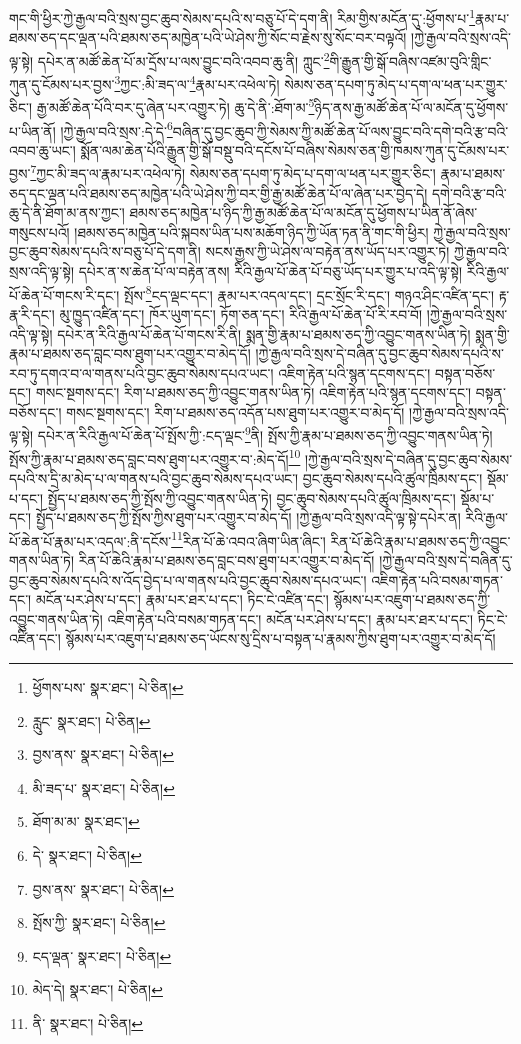 གང་གི་ཕྱིར་ཀྱེ་རྒྱལ་བའི་སྲས་བྱང་ཆུབ་སེམས་དཔའི་ས་བཅུ་པོ་དེ་དག་ནི། རིམ་གྱིས་མངོན་དུ་:ཕྱོགས་པ་\footnote{ཕྱོགས་པས་  སྣར་ཐང་།  པེ་ཅིན། }རྣམ་པ་ཐམས་ཅད་དང་ལྡན་པའི་ཐམས་ཅད་མཁྱེན་པའི་ཡེ་ཤེས་ཀྱི་སོང་བ་རྗེས་སུ་སོང་བར་བལྟའོ། །ཀྱེ་རྒྱལ་བའི་སྲས་འདི་ལྟ་སྟེ། དཔེར་ན་མཚོ་ཆེན་པོ་མ་དྲོས་པ་ལས་བྱུང་བའི་འབབ་ཆུ་ནི། ཀླུང་\footnote{རླུང་  སྣར་ཐང་།  པེ་ཅིན། }གི་རྒྱུན་གྱི་སྒོ་བཞིས་འཛམ་བུའི་གླིང་ཀུན་དུ་ངོམས་པར་བྱས་\footnote{བྱས་ནས་  སྣར་ཐང་།  པེ་ཅིན། }ཀྱང་:མི་ཟད་ལ་\footnote{མི་ཟད་པ་  སྣར་ཐང་།  པེ་ཅིན། }རྣམ་པར་འཕེལ་ཏེ། སེམས་ཅན་དཔག་ཏུ་མེད་པ་དག་ལ་ཕན་པར་གྱུར་ཅིང་། རྒྱ་མཚོ་ཆེན་པོའི་བར་དུ་ཞེན་པར་འགྱུར་ཏེ། ཆུ་དེ་ནི་:ཐོག་མ་\footnote{ཐོག་མ་མ་  སྣར་ཐང་། }ཉིད་ནས་རྒྱ་མཚོ་ཆེན་པོ་ལ་མངོན་དུ་ཕྱོགས་པ་ཡིན་ནོ། །ཀྱེ་རྒྱལ་བའི་སྲས་:དེ་དེ་\footnote{དེ་  སྣར་ཐང་།  པེ་ཅིན། }བཞིན་དུ་བྱང་ཆུབ་ཀྱི་སེམས་ཀྱི་མཚོ་ཆེན་པོ་ལས་བྱུང་བའི་དགེ་བའི་རྩ་བའི་འབབ་ཆུ་ཡང་། སྨོན་ལམ་ཆེན་པོའི་རྒྱུན་གྱི་སྒོ་བསྡུ་བའི་དངོས་པོ་བཞིས་སེམས་ཅན་གྱི་ཁམས་ཀུན་དུ་ངོམས་པར་བྱས་\footnote{བྱས་ནས་  སྣར་ཐང་།  པེ་ཅིན། }ཀྱང་མི་ཟད་ལ་རྣམ་པར་འཕེལ་ཏེ། སེམས་ཅན་དཔག་ཏུ་མེད་པ་དག་ལ་ཕན་པར་གྱུར་ཅིང་། རྣམ་པ་ཐམས་ཅད་དང་ལྡན་པའི་ཐམས་ཅད་མཁྱེན་པའི་ཡེ་ཤེས་ཀྱི་བར་གྱི་རྒྱ་མཚོ་ཆེན་པོ་ལ་ཞེན་པར་བྱེད་དེ། དགེ་བའི་རྩ་བའི་ཆུ་དེ་ནི་ཐོག་མ་ནས་ཀྱང་། ཐམས་ཅད་མཁྱེན་པ་ཉིད་ཀྱི་རྒྱ་མཚོ་ཆེན་པོ་ལ་མངོན་དུ་ཕྱོགས་པ་ཡིན་ནོ་ཞེས་གསུངས་པའོ། །ཐམས་ཅད་མཁྱེན་པའི་སྐབས་ཡིན་པས་མཆོག་ཉིད་ཀྱི་ཡོན་ཏན་ནི་གང་གི་ཕྱིར། ཀྱེ་རྒྱལ་བའི་སྲས་བྱང་ཆུབ་སེམས་དཔའི་ས་བཅུ་པོ་དེ་དག་ནི། སངས་རྒྱས་ཀྱི་ཡེ་ཤེས་ལ་བརྟེན་ནས་ཡོད་པར་འགྱུར་ཏེ། ཀྱེ་རྒྱལ་བའི་སྲས་འདི་ལྟ་སྟེ། དཔེར་ན་ས་ཆེན་པོ་ལ་བརྟེན་ནས། རིའི་རྒྱལ་པོ་ཆེན་པོ་བཅུ་ཡོད་པར་གྱུར་པ་འདི་ལྟ་སྟེ། རིའི་རྒྱལ་པོ་ཆེན་པོ་གངས་རི་དང་། སྤོས་\footnote{སྤོས་ཀྱི་  སྣར་ཐང་།  པེ་ཅིན། }ངད་ལྡང་དང་། རྣམ་པར་འདལ་དང་། དྲང་སྲོང་རི་དང་། གཉའ་ཤིང་འཛིན་དང་། རྟ་རྣ་རི་དང་། མུ་ཁྱུད་འཛིན་དང་། ཁོར་ཡུག་དང་། ཏོག་ཅན་དང་། རིའི་རྒྱལ་པོ་ཆེན་པོ་རི་རབ་བོ། །ཀྱེ་རྒྱལ་བའི་སྲས་འདི་ལྟ་སྟེ། དཔེར་ན་རིའི་རྒྱལ་པོ་ཆེན་པོ་གངས་རི་ནི། སྨན་གྱི་རྣམ་པ་ཐམས་ཅད་ཀྱི་འབྱུང་གནས་ཡིན་ཏེ། སྨན་གྱི་རྣམ་པ་ཐམས་ཅད་བླང་བས་ཐུག་པར་འགྱུར་བ་མེད་དོ། །ཀྱེ་རྒྱལ་བའི་སྲས་དེ་བཞིན་དུ་བྱང་ཆུབ་སེམས་དཔའི་ས་རབ་ཏུ་དགའ་བ་ལ་གནས་པའི་བྱང་ཆུབ་སེམས་དཔའ་ཡང་། འཇིག་རྟེན་པའི་སྙན་དངགས་དང་། བསྟན་བཅོས་དང་། གསང་སྔགས་དང་། རིག་པ་ཐམས་ཅད་ཀྱི་འབྱུང་གནས་ཡིན་ཏེ། འཇིག་རྟེན་པའི་སྙན་དངགས་དང་། བསྟན་བཅོས་དང་། གསང་སྔགས་དང་། རིག་པ་ཐམས་ཅད་འདོན་པས་ཐུག་པར་འགྱུར་བ་མེད་དོ། །ཀྱེ་རྒྱལ་བའི་སྲས་འདི་ལྟ་སྟེ། དཔེར་ན་རིའི་རྒྱལ་པོ་ཆེན་པོ་སྤོས་ཀྱི་:ངད་ལྡང་\footnote{ངད་ལྡན་  སྣར་ཐང་།  པེ་ཅིན། }ནི། སྤོས་ཀྱི་རྣམ་པ་ཐམས་ཅད་ཀྱི་འབྱུང་གནས་ཡིན་ཏེ། སྤོས་ཀྱི་རྣམ་པ་ཐམས་ཅད་བླང་བས་ཐུག་པར་འགྱུར་བ་:མེད་དོ།\footnote{མེད་དེ།  སྣར་ཐང་།  པེ་ཅིན། } །ཀྱེ་རྒྱལ་བའི་སྲས་དེ་བཞིན་དུ་བྱང་ཆུབ་སེམས་དཔའི་ས་དྲི་མ་མེད་པ་ལ་གནས་པའི་བྱང་ཆུབ་སེམས་དཔའ་ཡང་། བྱང་ཆུབ་སེམས་དཔའི་ཚུལ་ཁྲིམས་དང་། སྡོམ་པ་དང་། སྤྱོད་པ་ཐམས་ཅད་ཀྱི་སྤོས་ཀྱི་འབྱུང་གནས་ཡིན་ཏེ། བྱང་ཆུབ་སེམས་དཔའི་ཚུལ་ཁྲིམས་དང་། སྡོམ་པ་དང་། སྤྱོད་པ་ཐམས་ཅད་ཀྱི་སྤོས་ཀྱིས་ཐུག་པར་འགྱུར་བ་མེད་དོ། །ཀྱེ་རྒྱལ་བའི་སྲས་འདི་ལྟ་སྟེ་དཔེར་ན། རིའི་རྒྱལ་པོ་ཆེན་པོ་རྣམ་པར་འདལ་:ནི་དངོས་\footnote{ནི་  སྣར་ཐང་།  པེ་ཅིན། }རིན་པོ་ཆེ་འབའ་ཞིག་ཡིན་ཞིང་། རིན་པོ་ཆེའི་རྣམ་པ་ཐམས་ཅད་ཀྱི་འབྱུང་གནས་ཡིན་ཏེ། རིན་པོ་ཆེའི་རྣམ་པ་ཐམས་ཅད་བླང་བས་ཐུག་པར་འགྱུར་བ་མེད་དོ། །ཀྱེ་རྒྱལ་བའི་སྲས་དེ་བཞིན་དུ་བྱང་ཆུབ་སེམས་དཔའི་ས་འོད་བྱེད་པ་ལ་གནས་པའི་བྱང་ཆུབ་སེམས་དཔའ་ཡང་། འཇིག་རྟེན་པའི་བསམ་གཏན་དང་། མངོན་པར་ཤེས་པ་དང་། རྣམ་པར་ཐར་པ་དང་། ཏིང་ངེ་འཛིན་དང་། སྙོམས་པར་འཇུག་པ་ཐམས་ཅད་ཀྱི་འབྱུང་གནས་ཡིན་ཏེ། འཇིག་རྟེན་པའི་བསམ་གཏན་དང་། མངོན་པར་ཤེས་པ་དང་། རྣམ་པར་ཐར་པ་དང་། ཏིང་ངེ་འཛིན་དང་། སྙོམས་པར་འཇུག་པ་ཐམས་ཅད་ཡོངས་སུ་དྲིས་པ་བསྟན་པ་རྣམས་ཀྱིས་ཐུག་པར་འགྱུར་བ་མེད་དོ། 